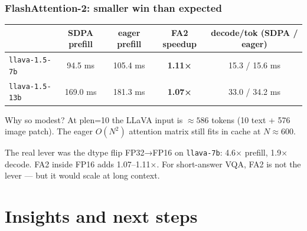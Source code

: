 \documentclass[
	11pt,
	aspectratio=169,
]{beamer}
\begin{document}

\begin{frame}
	\frametitle{FlashAttention-2: smaller win than expected}

	\footnotesize
	\begin{table}
		\centering
		\begin{tabular}{@{}lcccc@{}}
			\toprule
			 & SDPA prefill & eager prefill & FA2 speedup & decode/tok (SDPA / eager) \\
			\midrule
			\texttt{llava-1.5-7b}  &  94.5 ms & 105.4 ms & \textbf{1.11×} & 15.3 / 15.6 ms \\
			\texttt{llava-1.5-13b} & 169.0 ms & 181.3 ms & \textbf{1.07×} & 33.0 / 34.2 ms \\
			\bottomrule
		\end{tabular}
	\end{table}

	\smallskip

	\begin{block}{Why so modest?}
		\footnotesize At plen=10 the LLaVA input is $\approx 586$ tokens (10 text + 576 image patch). The eager $O(N^2)$ attention matrix still fits in cache at $N\approx 600$.
	\end{block}

	\begin{exampleblock}{The real lever was the dtype flip}
		\footnotesize FP32→FP16 on \texttt{llava-7b}: 4.6× prefill, 1.9× decode. FA2 inside FP16 adds 1.07–1.11×. For short-answer VQA, FA2 is not the lever — but it would scale at long context.
	\end{exampleblock}
\end{frame}

\section{Insights and next steps}
\end{document}
